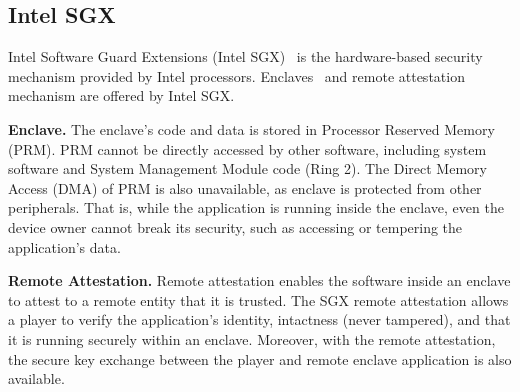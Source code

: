 \subsection{Intel SGX}
Intel Software Guard Extensions (Intel SGX)~\cite{costan2016intel} is the hardware-based security  mechanism provided by Intel processors.  Enclaves~\cite{costan2016intel} and remote attestation~\cite{costan2016intel} mechanism are offered by Intel SGX.

\vspace{1mm}\noindent\textbf{Enclave.}
The enclave’s code and data is stored in Processor Reserved Memory (PRM).
PRM cannot be directly accessed by other software, including system software and System Management Module code (Ring 2).
The Direct Memory Access (DMA) of PRM is also unavailable, as enclave is protected from other peripherals. That is, while the application is running inside the enclave, even the device owner cannot break its security, such as accessing or tempering the application's data.



\vspace{1mm}\noindent\textbf{Remote Attestation.}
Remote attestation enables the software inside an  enclave to attest to a remote entity that it is trusted.
The SGX remote attestation allows a player to verify the application's identity, intactness (never tampered), and that it is running securely within an enclave.
Moreover, with the remote attestation, the secure key exchange between the player and remote enclave application is also available.%


